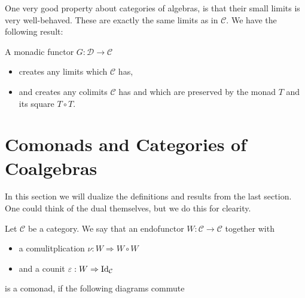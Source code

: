 \documentclass[../thesis.tex]{subfiles}
\begin{document}
        One very good property about categories of algebras, is that their small limits is very well-behaved. These are exactly the same limits as in $\mathcal{C}$. We have the following result:
        \begin{thm}
            A monadic functor $G : \mathcal{D} \rightarrow \mathcal{C}$
            \begin{itemize}
                \item creates any limits which $\mathcal{C}$ has,
                \item and creates any colimits $\mathcal{C}$ has and which are preserved by the monad $T$ and its square $T\circ T$.
            \end{itemize}
        \end{thm}

    \section{Comonads and Categories of Coalgebras}
        In this section we will dualize the definitions and results from the last section. One could think of the dual themselves, but we do this for clearity.

    \begin{definition}[Comonad]
        Let $\mathcal{C}$ be a category. We say that an endofunctor $W : \mathcal{C} \rightarrow \mathcal{C}$ together with
        \begin{itemize}
            \item a comulitplication $\nu : W \Rightarrow W\circ W$
            \item and a counit $\varepsilon : W \Rightarrow \tt{Id}_\mathcal{C}$
        \end{itemize}
        is a comonad, if the following diagrams commute
        \begin{center}
        \end{center}
    \end{definition}
\end{document}
